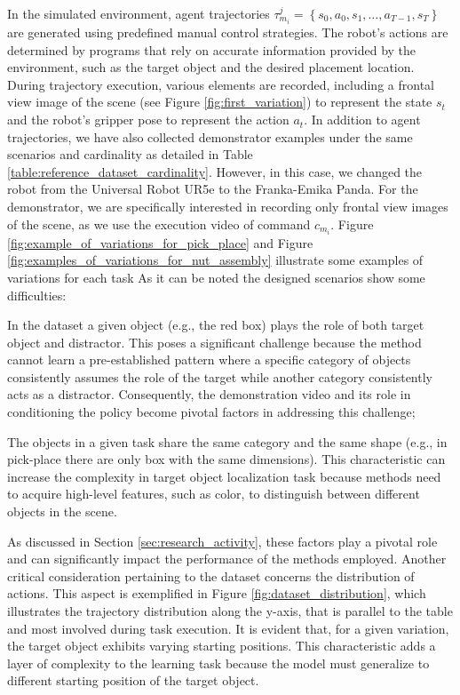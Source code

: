 In the simulated environment, agent trajectories $\tau^{j}_{m_{i}} = \left \{ s_{0}, a_{0}, s_{1},\dots, a_{T-1}, s_{T}\right \}$ are generated using predefined manual control strategies. The robot's actions are determined by programs that rely on accurate information provided by the environment, such as the target object and the desired placement location. During trajectory execution, various elements are recorded, including a frontal view image of the scene (see Figure \ref{fig:first_variation}) to represent the state $s_{t}$ and the robot's gripper pose to represent the action $a_{t}$. In addition to agent trajectories, we have also collected demonstrator examples under the same scenarios and cardinality as detailed in Table \ref{table:reference_dataset_cardinality}. However, in this case, we changed the robot from the Universal Robot UR5e to the Franka-Emika Panda. For the demonstrator, we are specifically interested in recording only frontal view images of the scene, as we use the execution video of command $c_{m_{i}}$. Figure \ref{fig:example_of_variations_for_pick_place} and Figure \ref{fig:examples_of_variations_for_nut_assembly} illustrate some examples of variations for each task
As it can be noted the designed scenarios show some difficulties:
\begin{itemize*}[label=$(\bullet)$]
    \item In the dataset a given object (e.g., the red box) plays the role of both target object and distractor. This poses a significant challenge because the method cannot learn a pre-established pattern where a specific category of objects consistently assumes the role of the target while another category consistently acts as a distractor. Consequently, the demonstration video and its role in conditioning the policy become pivotal factors in addressing this challenge;
    \item The objects in a given task share the same category and the same shape (e.g., in pick-place there are only box with the same dimensions). This characteristic can increase the complexity in target object localization task because methods need to acquire high-level features, such as color, to distinguish between different objects in the scene.
\end{itemize*}

\noindent As discussed in Section \ref{sec:research_activity}, these factors play a pivotal role and can significantly impact the performance of the methods employed.
Another critical consideration pertaining to the dataset concerns the distribution of actions. This aspect is exemplified in Figure \ref{fig:dataset_distribution}, which illustrates the trajectory distribution along the y-axis, that is parallel to the table and most involved during task execution. It is evident that, for a given variation, the target object exhibits varying starting positions. This characteristic adds a layer of complexity to the learning task because the model must generalize to different starting position of the target object.



